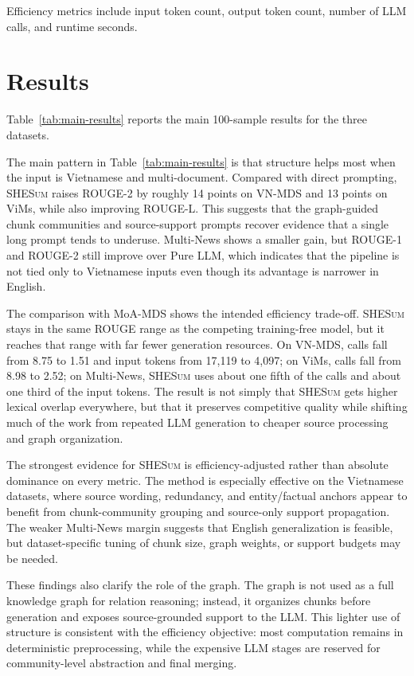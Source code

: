 \documentclass[11pt]{article}
\newcommand{\methodname}{\textsc{SHESum}}
\begin{document}
Efficiency metrics include input token count, output token count, number of LLM calls, and runtime seconds.

\section{Results}
\label{sec:results}

Table~\ref{tab:main-results} reports the main 100-sample results for the three datasets.


The main pattern in Table~\ref{tab:main-results} is that structure helps most when the input is Vietnamese and multi-document. Compared with direct prompting, \methodname{} raises ROUGE-2 by roughly 14 points on VN-MDS and 13 points on ViMs, while also improving ROUGE-L. This suggests that the graph-guided chunk communities and source-support prompts recover evidence that a single long prompt tends to underuse. Multi-News shows a smaller gain, but ROUGE-1 and ROUGE-2 still improve over Pure LLM, which indicates that the pipeline is not tied only to Vietnamese inputs even though its advantage is narrower in English.

The comparison with MoA-MDS shows the intended efficiency trade-off. \methodname{} stays in the same ROUGE range as the competing training-free model, but it reaches that range with far fewer generation resources. On VN-MDS, calls fall from 8.75 to 1.51 and input tokens from 17,119 to 4,097; on ViMs, calls fall from 8.98 to 2.52; on Multi-News, \methodname{} uses about one fifth of the calls and about one third of the input tokens. The result is not simply that \methodname{} gets higher lexical overlap everywhere, but that it preserves competitive quality while shifting much of the work from repeated LLM generation to cheaper source processing and graph organization.

The strongest evidence for \methodname{} is efficiency-adjusted rather than absolute dominance on every metric. The method is especially effective on the Vietnamese datasets, where source wording, redundancy, and entity/factual anchors appear to benefit from chunk-community grouping and source-only support propagation. The weaker Multi-News margin suggests that English generalization is feasible, but dataset-specific tuning of chunk size, graph weights, or support budgets may be needed.

These findings also clarify the role of the graph. The graph is not used as a full knowledge graph for relation reasoning; instead, it organizes chunks before generation and exposes source-grounded support to the LLM. This lighter use of structure is consistent with the efficiency objective: most computation remains in deterministic preprocessing, while the expensive LLM stages are reserved for community-level abstraction and final merging.
\end{document}
